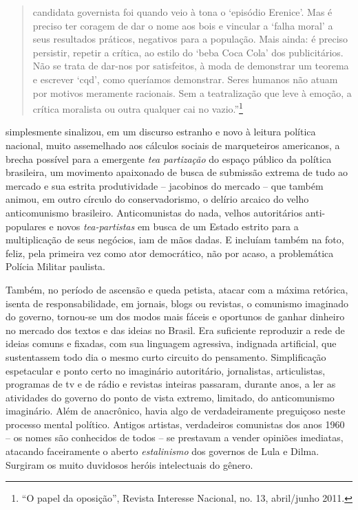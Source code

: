 \begin{quote}
candidata governista foi quando veio à tona o `episódio Erenice'. Mas é
preciso ter coragem de dar o nome aos bois e vincular a `falha moral' a
seus resultados práticos, negativos para a população. Mais ainda: é
preciso persistir, repetir a crítica, ao estilo do `beba Coca Cola' dos
publicitários. Não se trata de dar-nos por satisfeitos, à moda de
demonstrar um teorema e escrever `cqd', como queríamos demonstrar. Seres
humanos não atuam por motivos meramente racionais. Sem a teatralização
que leve à emoção, a crítica moralista ou outra qualquer cai no
vazio.''\footnote{``O papel da oposição'', Revista Interesse Nacional,
  no. 13, abril/junho 2011.}
\end{quote}

 simplesmente sinalizou, em um discurso estranho e novo à leitura política
nacional, muito assemelhado aos cálculos sociais de marqueteiros americanos, a
brecha possível para a emergente \textit{tea partização} do espaço público da política
brasileira, um movimento apaixonado de busca de submissão extrema de tudo ao
mercado e sua estrita produtividade -- jacobinos do mercado -- que também animou,
em outro círculo do conservadorismo, o delírio arcaico do velho anticomunismo
brasileiro. Anticomunistas do nada, velhos autoritários anti-populares e novos
\textit{tea-partistas} em busca de um Estado estrito para a multiplicação de seus
negócios, iam de mãos dadas. E incluíam também na foto, feliz, pela primeira
vez como ator democrático, não por acaso, a problemática Polícia Militar
paulista. 

Também, no período de ascensão e queda petista, atacar com a máxima
retórica, isenta de responsabilidade, em jornais, blogs ou revistas, o
comunismo imaginado do governo, tornou-se um dos modos mais fáceis e
oportunos de ganhar dinheiro no mercado dos textos e das ideias no
Brasil. Era suficiente reproduzir a rede de ideias comuns e fixadas, com
sua linguagem agressiva, indignada artificial, que sustentassem todo dia
o mesmo curto circuito do pensamento. Simplificação espetacular e ponto
certo no imaginário autoritário, jornalistas, articulistas, programas de
tv e de rádio e revistas inteiras passaram, durante anos, a ler as
atividades do governo do ponto de vista extremo, limitado, do
anticomunismo imaginário. Além de anacrônico, havia algo de
verdadeiramente preguiçoso neste processo mental político. Antigos
artistas, verdadeiros comunistas dos anos 1960 -- os nomes são
conhecidos de todos -- se prestavam a vender opiniões imediatas,
atacando faceiramente o aberto \emph{estalinismo} dos governos de Lula e
Dilma. Surgiram os muito duvidosos heróis intelectuais do gênero.

